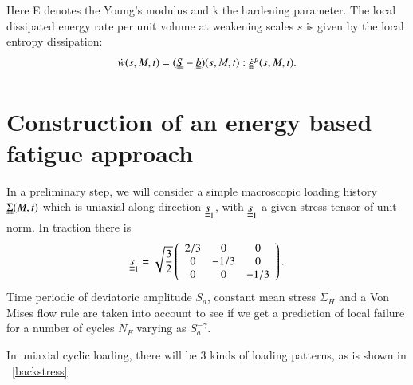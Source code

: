 \documentclass[3p,times,procedia,number]{elsarticle}
\newcommand{\figref}[1]{\figurename~\ref{#1}}
\begin{document}
Here E denotes the Young's modulus and k the hardening parameter. The local dissipated energy rate per unit volume at weakening scales $s$  is given by the local entropy dissipation:
\begin{equation}
\dot{w}(s,M,t)=(\uuline{S}-\uuline{b})(s,M,t):\uuline{\dot{\varepsilon}}^p(s,M,t).
\label{dissipated}
\end{equation}

\section{Construction of an energy based fatigue approach}
\label{sec:5.5}
In a preliminary step, we will consider a simple macroscopic loading history $\uuline{\Sigma}(M, t)$ which is uniaxial
 along direction $\uline{\uline{s}}_1$, with $\uline{\uline{s}}_1$ a given stress tensor of unit norm. In traction there is 
 $$\uline{\uline{s}}_1=\sqrt{\dfrac{3}{2}}	\left(
 \begin{array}{ccc}
2/3 & 0 & 0\\
 0 & -1/3 & 0\\ 
 0 & 0 & -1/3\\
 \end{array}\right) . $$
  Time periodic of deviatoric amplitude $S_{a}$, constant mean stress $\Sigma_{H}$ and a Von Mises flow rule are taken into account to see if we get a prediction of local failure for a number of cycles $N_F$ varying as $S_{a}^{-\gamma}.$

In uniaxial cyclic loading, there will be 3 kinds of loading patterns, as is shown in \figref{backstress}:
\end{document}
